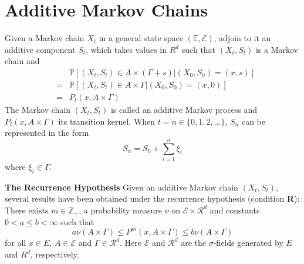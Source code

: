 \documentclass[12pt]{article}
\newcommand{\p}{
        \mathbb{P}
}
\begin{document}
\section{Additive Markov Chains}
Given a Markov chain $X_t$ in a general state space $(\mathds E,
\mathscr E)$, adjoin to it an additive component $S_t$,
which takes values in $R^d$ such that $(X_t, S_t) $ is a Markov chain
and
\begin{eqnarray*}
&& \p[(X_t, S_t) \in A \times (\Gamma + s) | (X_0, S_0) = (x, s)] \\
&=& \p[(X_t, S_t) \in A \times \Gamma | (X_0, S_0) = (x, 0)] \\
&=& P_t(x, A \times \Gamma)
\end{eqnarray*}
The Markov chain $(X_t, S_t)$ is called an additive Markov process and
$P_t(x, A \times \Gamma)$ its transition kernel.
When $t = n \in \{0, 1, 2, \dots\}$, $S_n$ can be represented in the
form
\[
S_n = S_0 + \sum_{i=1}^n \xi_i
\]
where $\xi_i \in \Gamma$.

{\bf The Recurrence Hypothesis}
Given an additive Markov chain $(X_t, S_t)$, several results have been
obtained under the recurrence hypothesis (condition {\bf R}): There
exists $m \in \mathds Z_+$, a probability measure $\nu$ on $\mathscr E
\times \mathscr R^d$ and constants $0 < a \leq b < \infty$ such that
\[
a \nu(A \times \Gamma) \leq P^m(x, A \times \Gamma) \leq b \nu(A
\times \Gamma)
\]
for all $x \in E$, $A \in \mathscr E$ and $\Gamma \in \mathscr
R^d$. Here $\mathscr E$ and $\mathscr R^d$ are the $\sigma$-fields
generated by $E$ and $R^d$, respectively.
\end{document}
